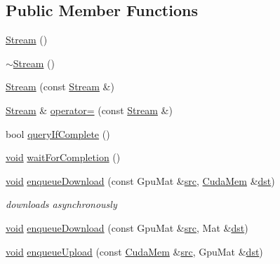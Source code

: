 \subsection*{Public Member Functions}
\begin{DoxyCompactItemize}
\item 
\hyperlink{classcv_1_1gpu_1_1Stream_a16da84336fd74f6f59f9ed313478c40a}{Stream} ()
\item 
\hyperlink{classcv_1_1gpu_1_1Stream_a8276d6cecce4cd705fd23db87c44c52f}{$\sim$\-Stream} ()
\item 
\hyperlink{classcv_1_1gpu_1_1Stream_a72b27e1100253dc941a9fe873bc04458}{Stream} (const \hyperlink{classcv_1_1gpu_1_1Stream}{Stream} \&)
\item 
\hyperlink{classcv_1_1gpu_1_1Stream}{Stream} \& \hyperlink{classcv_1_1gpu_1_1Stream_ada7242008b8529778f5a7b17e1bff2e2}{operator=} (const \hyperlink{classcv_1_1gpu_1_1Stream}{Stream} \&)
\item 
bool \hyperlink{classcv_1_1gpu_1_1Stream_a038199427a28e5cd11fba8c4f66196e2}{query\-If\-Complete} ()
\item 
\hyperlink{legacy_8hpp_a8bb47f092d473522721002c86c13b94e}{void} \hyperlink{classcv_1_1gpu_1_1Stream_a57cf29274828930cbe8a0edde5ef08e2}{wait\-For\-Completion} ()
\item 
\hyperlink{legacy_8hpp_a8bb47f092d473522721002c86c13b94e}{void} \hyperlink{classcv_1_1gpu_1_1Stream_a67427ebea267e518cfa0d41f934a2b91}{enqueue\-Download} (const Gpu\-Mat \&\hyperlink{legacy_8hpp_a371cd109b74033bc4366f584edd3dacc}{src}, \hyperlink{classcv_1_1gpu_1_1CudaMem}{Cuda\-Mem} \&\hyperlink{photo__c_8h_aed13e2a25279b24dc954073233fef7a5}{dst})
\begin{DoxyCompactList}\small\item\em downloads asynchronously \end{DoxyCompactList}\item 
\hyperlink{legacy_8hpp_a8bb47f092d473522721002c86c13b94e}{void} \hyperlink{classcv_1_1gpu_1_1Stream_af97305361b3e6a2414500ad60025d669}{enqueue\-Download} (const Gpu\-Mat \&\hyperlink{legacy_8hpp_a371cd109b74033bc4366f584edd3dacc}{src}, Mat \&\hyperlink{photo__c_8h_aed13e2a25279b24dc954073233fef7a5}{dst})
\item 
\hyperlink{legacy_8hpp_a8bb47f092d473522721002c86c13b94e}{void} \hyperlink{classcv_1_1gpu_1_1Stream_a7ca34f86e6ee9d55a46af099927f871e}{enqueue\-Upload} (const \hyperlink{classcv_1_1gpu_1_1CudaMem}{Cuda\-Mem} \&\hyperlink{legacy_8hpp_a371cd109b74033bc4366f584edd3dacc}{src}, Gpu\-Mat \&\hyperlink{photo__c_8h_aed13e2a25279b24dc954073233fef7a5}{dst})

\end{DoxyCompactItemize}
